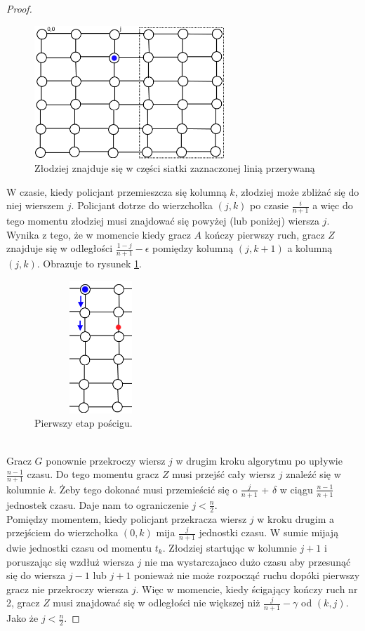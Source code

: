 \documentclass[brudnopis]{xmgr}
\theoremstyle{definition}
\begin{document}
\begin{proof}
	\begin{figure}[ht!]
	  \centering
	  \includegraphics[height=5cm]{rysunki/podsiatka.png}
	  \caption{Złodziej znajduje się w części siatki zaznaczonej linią przerywaną}
	\end{figure} 

	\indent W czasie, kiedy policjant przemieszcza się kolumną $k$, złodziej może zbliżać się do niej wierszem $j$. Policjant dotrze do wierzchołka $(j,k)$ po czasie $\frac{i}{n+1}$ a więc do tego momentu złodziej musi znajdować się powyżej (lub poniżej) wiersza $j$. Wynika z tego, że w momencie kiedy gracz $A$ kończy pierwszy ruch, gracz $Z$ znajduje się w odległości $\frac{1-j}{n+1} - \epsilon$ pomiędzy kolumną $(j,k + 1)$ a kolumną $(j,k)$. Obrazuje to rysunek \ref{fig:pierwszy krok}.
	\begin{figure}[ht!]
	  \centering
	  \includegraphics[width=5cm,height=5cm]{rysunki/poscig_1.png}
	  \caption{Pierwszy etap pościgu.}
	  \label{fig:pierwszy krok}
	\end{figure}
	\\\indent Gracz $G$ ponownie przekroczy wiersz $j$ w drugim kroku algorytmu po upływie $\frac{n-1}{n+1}$ czasu. Do tego momentu gracz $Z$ musi przejść cały wiersz $j$ znaleźć się w kolumnie $k$. Żeby tego dokonać musi przemieścić się o $\frac{j}{n+1}$ + $\delta$ w ciągu $\frac{n-1}{n+1}$ jednostek czasu. Daje nam to ograniczenie $j < \frac{n}{2}$.
	\\\indent Pomiędzy momentem, kiedy policjant przekracza wiersz $j$ w kroku drugim a przejściem do wierzchołka $(0,k)$ mija $\frac{j}{n+1}$ jednostki czasu. W sumie mijają dwie jednostki czasu od momentu $t_k$. Złodziej startując w kolumnie $j + 1$ i poruszając się wzdłuż wiersza $j$ nie ma wystarczajaco dużo czasu aby przesunąć się do wiersza $j - 1$ lub $j + 1$ ponieważ nie może rozpocząć ruchu dopóki pierwszy gracz nie przekroczy wiersza $j$. Więc w momencie, kiedy ścigający kończy ruch nr 2, gracz $Z$ musi znajdować się w odległości nie większej niż $\frac{j}{n+1} - \gamma$ od $(k,j)$. Jako że $j < \frac{n}{2}$.

\end{proof}
\end{document}
